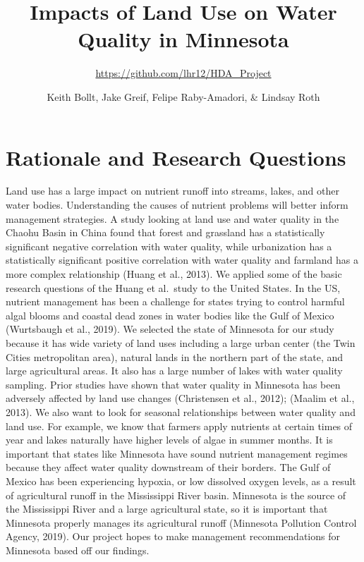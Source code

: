 \documentclass[12pt,]{article}
\title{Impacts of Land Use on Water Quality in Minnesota}
\subtitle{\url{https://github.com/lhr12/HDA_Project}}
\author{Keith Bollt, Jake Greif, Felipe Raby-Amadori, \& Lindsay Roth}
\date{}
\begin{document}
\maketitle

\newpage
\tableofcontents 
\newpage
\listoftables 
\newpage
\listoffigures 
\newpage

\hypertarget{rationale-and-research-questions}{%
\section{Rationale and Research
Questions}\label{rationale-and-research-questions}}

Land use has a large impact on nutrient runoff into streams, lakes, and
other water bodies. Understanding the causes of nutrient problems will
better inform management strategies. A study looking at land use and
water quality in the Chaohu Basin in China found that forest and
grassland has a statistically significant negative correlation with
water quality, while urbanization has a statistically significant
positive correlation with water quality and farmland has a more complex
relationship (Huang et al., 2013). We applied some of the basic research
questions of the Huang et al.~study to the United States. In the US,
nutrient management has been a challenge for states trying to control
harmful algal blooms and coastal dead zones in water bodies like the
Gulf of Mexico (Wurtsbaugh et al., 2019). We selected the state of
Minnesota for our study because it has wide variety of land uses
including a large urban center (the Twin Cities metropolitan area),
natural lands in the northern part of the state, and large agricultural
areas. It also has a large number of lakes with water quality sampling.
Prior studies have shown that water quality in Minnesota has been
adversely affected by land use changes (Christensen et al., 2012);
(Maalim et al., 2013). We also want to look for seasonal relationships
between water quality and land use. For example, we know that farmers
apply nutrients at certain times of year and lakes naturally have higher
levels of algae in summer months. It is important that states like
Minnesota have sound nutrient management regimes because they affect
water quality downstream of their borders. The Gulf of Mexico has been
experiencing hypoxia, or low dissolved oxygen levels, as a result of
agricultural runoff in the Mississippi River basin. Minnesota is the
source of the Mississippi River and a large agricultural state, so it is
important that Minnesota properly manages its agricultural runoff
(Minnesota Pollution Control Agency, 2019). Our project hopes to make
management recommendations for Minnesota based off our findings.
\end{document}
